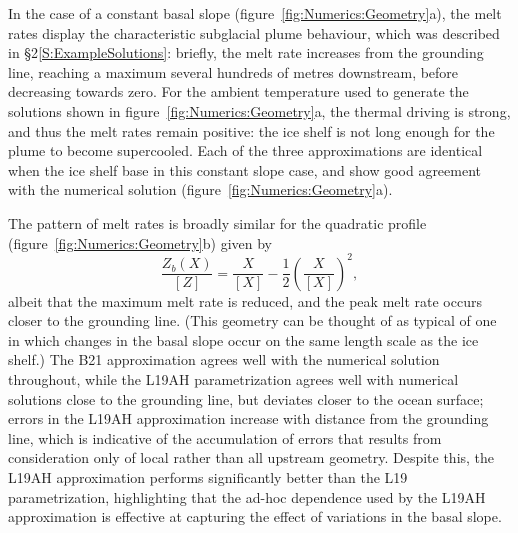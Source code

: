 \documentclass[openacc]{rsproca_new}%
\begin{document}
In the case of a constant basal slope (figure~\ref{fig:Numerics:Geometry}a), the melt rates display the characteristic subglacial plume behaviour, which was described in \S2\ref{S:ExampleSolutions}: briefly, the melt rate increases from the grounding line, reaching a maximum several hundreds of metres downstream, before decreasing towards zero. For the ambient temperature used to generate the solutions shown in figure~\ref{fig:Numerics:Geometry}a, the thermal driving is strong, and thus the melt rates remain positive: the ice shelf is not long enough for the plume to become supercooled. Each of the three approximations are identical when the ice shelf base in this constant slope case, and show good agreement with the numerical solution (figure~\ref{fig:Numerics:Geometry}a).

The pattern of melt rates is broadly similar for the quadratic profile (figure~\ref{fig:Numerics:Geometry}b) given by
\begin{equation}\label{E:Numerics:QuadraticGeometry}
\frac{Z_b(X)}{\left[Z\right]}= \frac{X}{\left[X\right]} - \frac{1}{2}\left(\frac{X}{\left[X\right]}\right)^2,
\end{equation}
albeit that the maximum melt rate is reduced, and the peak melt rate occurs closer to the grounding line. (This geometry can be thought of as typical of one in which changes in the basal slope occur on the same length scale as the ice shelf.) The B21 approximation agrees well with the numerical solution throughout, while the L19AH parametrization agrees well with numerical solutions close to the grounding line, but deviates closer to the ocean surface; errors in the L19AH approximation increase with distance from the grounding line, which is indicative of the accumulation of errors that results from consideration only of local rather than all upstream geometry. Despite this, the L19AH approximation performs significantly better than the L19 parametrization, highlighting that the ad-hoc dependence used by the L19AH approximation is effective at capturing the effect of variations in the basal slope.
\end{document}
